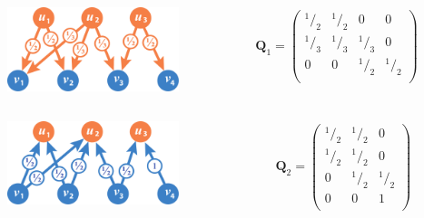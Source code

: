\documentclass{beamer}
\newcommand{\mQ}{\mathbf{Q}}
\newcommand*\rfrac[2]{{}^{#1}\!/_{#2}}
\begin{document}
\begin{frame}
\begin{columns}[T] %
\begin{column}{.48\textwidth}
\begin{figure}[h] 
    \includegraphics[width=5cm]{DemoGraphQ1.pdf}
\end{figure}
\end{column}%
\hfill%
\begin{column}{.48\textwidth}
\begin{eqnarray*}
\mQ_1 =  \left(
 \begin{array}{cccc}
    \rfrac{1}{2} & \rfrac{1}{2}& 0& 0\\
    \rfrac{1}{3}& \rfrac{1}{3}& \rfrac{1}{3}& 0\\
    0& 0& \rfrac{1}{2}& \rfrac{1}{2}\\
  \end{array}
   \right)
\end{eqnarray*}

\end{column}%
\end{columns}
\end{frame}

\begin{frame}
\begin{columns}[T] %
\begin{column}{.48\textwidth}
\begin{figure}[h] 
    \includegraphics[width=5cm]{DemoGraphQ2.pdf}
\end{figure}
\end{column}%
\hfill%
\begin{column}{.48\textwidth}
\begin{eqnarray*}
\mQ_2 = \left(
 \begin{array}{ccc}
    \rfrac{1}{2}& \rfrac{1}{2}& 0\\
    \rfrac{1}{2}& \rfrac{1}{2}& 0\\
    0& \rfrac{1}{2}& \rfrac{1}{2}\\
    0& 0& 1\\
  \end{array}
   \right)
\end{eqnarray*}
\end{column}%
\end{columns}
\end{frame}

\begin{frame}[allowframebreaks]


\end{frame}

\begin{frame}
\frametitle{}
\framesubtitle{}
\begin{itemize}
  
\end{itemize}
\end{frame}
\end{document}
